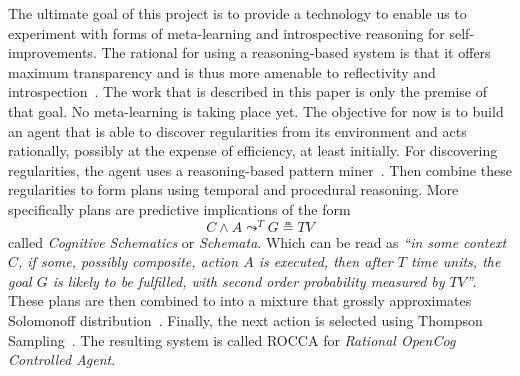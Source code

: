 \documentclass[runningheads]{llncs}
\newcommand{\lpreimp}[1]{\leadsto^{#1}}
\begin{document}
The ultimate goal of this project is to provide a technology to enable
us to experiment with forms of meta-learning and introspective
reasoning for self-improvements.  The rational for using a
reasoning-based system is that it offers maximum transparency and is
thus more amenable to reflectivity and
introspection~\cite{Schmidhuber2003, Goertzel2014EGI1}.  The work that
is described in this paper is only the premise of that goal.  No
meta-learning is taking place yet.  The objective for now is to build
an agent that is able to discover regularities from its environment
and acts rationally, possibly at the expense of efficiency, at least
initially.  For discovering regularities, the agent uses a
reasoning-based pattern miner~\cite{Geisweiller2019}.  Then combine
these regularities to form plans using temporal and procedural
reasoning.  More specifically plans are predictive implications of the
form
$$C \land A \lpreimp{T} G \measeq \textit{TV}$$
called \emph{Cognitive Schematics} or \emph{Schemata}.  Which can be
read as \emph{``in some context $C$, if some, possibly composite,
  action $A$ is executed, then after $T$ time units, the goal $G$ is
  likely to be fulfilled, with second order probability measured by
  $\textit{TV}$''}.  These plans are then combined to into a mixture
that grossly approximates Solomonoff
distribution~\cite{Geisweiller2018}.  Finally, the next action is
selected using Thompson Sampling~\cite{Leike2016}.  The resulting
system is called ROCCA for \emph{Rational OpenCog Controlled Agent}.



\end{document}
